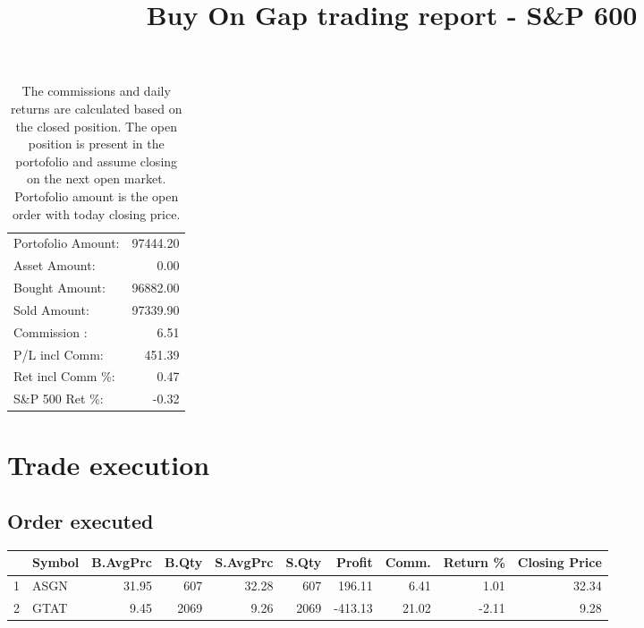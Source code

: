 \documentclass{tufte-handout}\usepackage[]{graphicx}\usepackage[]{color}
\begin{document}
\begin{table}[ht]
\begin{tabular}{lr}
   \hline
Portofolio Amount: & 97444.20 \\ 
  Asset Amount: & 0.00 \\ 
  Bought Amount: & 96882.00 \\ 
  Sold   Amount: & 97339.90 \\ 
  Commission   : & 6.51 \\ 
  P/L incl Comm: & 451.39 \\ 
  Ret incl Comm \%: & 0.47 \\ 
  S\&P 500 Ret \%: & -0.32 \\ 
   \hline
\end{tabular}
\caption{The commissions and daily returns are calculated based on the closed position.
The open position is present in the portofolio and assume closing on the next open market.
Portofolio amount is the open order with today closing price.} 
\end{table}



% 
% 


\title{Buy On Gap trading report - S\&P 600}
\maketitle

\section{Trade execution}
\subsection{Order executed}


\begin{table}[ht]
\centering
\begin{tabular}{llrrrrrrr|r}
  \hline
 & Symbol & B.AvgPrc & B.Qty & S.AvgPrc & S.Qty & Profit & Comm. & Return \% & Closing Price \\ 
  \hline
1 & ASGN & 31.95 & 607 & 32.28 & 607 & 196.11 & 6.41 & 1.01 & 32.34 \\ 
  2 & GTAT & 9.45 & 2069 & 9.26 & 2069 & -413.13 & 21.02 & -2.11 & 9.28 \\ 
   \hline
\end{tabular}
\end{table}
\end{document}
